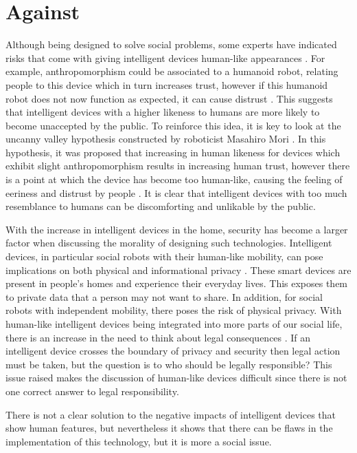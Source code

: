 \documentclass{article}
\begin{document}
\section{Against}
Although being designed to solve social problems, some experts have indicated risks that come with giving intelligent devices human-like appearances \cite{phillips2018risks}. For example, anthropomorphism could be associated to a humanoid robot, relating people to this device which in turn increases trust, however if this humanoid robot does not now function as expected, it can cause distrust \cite{phillips2018risks}. This suggests that intelligent devices with a higher likeness to humans are more likely to become unaccepted by the public. To reinforce this idea, it is key to look at the uncanny valley hypothesis constructed by roboticist Masahiro Mori \cite{mara2022uncanny, mori1970valley}. In this hypothesis, it was proposed that increasing in human likeness for devices which exhibit slight anthropomorphism results in increasing human trust, however there is a point at which the device has become too human-like, causing the feeling of eeriness and distrust by people \cite{mara2022uncanny, mori1970valley}. It is clear that intelligent devices with too much resemblance to humans can be discomforting and unlikable by the public.\par
With the increase in intelligent devices in the home, security has become a larger factor when discussing the morality of designing such technologies. Intelligent devices, in particular social robots with their human-like mobility, can pose implications on both physical and informational privacy \cite{lutz2019privacy}. These smart devices are present in people’s homes and experience their everyday lives. This exposes them to private data that a person may not want to share. In addition, for social robots with independent mobility, there poses the risk of physical privacy. With human-like intelligent devices being integrated into more parts of our social life, there is an increase in the need to think about legal consequences \cite{khoury2017legal}. If an intelligent device crosses the boundary of privacy and security then legal action must be taken, but the question is to who should be legally responsible? \cite{khoury2017legal} This issue raised makes the discussion of human-like devices difficult since there is not one correct answer to legal responsibility.\par
There is not a clear solution to the negative impacts of intelligent devices that show human features, but nevertheless it shows that there can be flaws in the implementation of this technology, but it is more a social issue.
\end{document}
